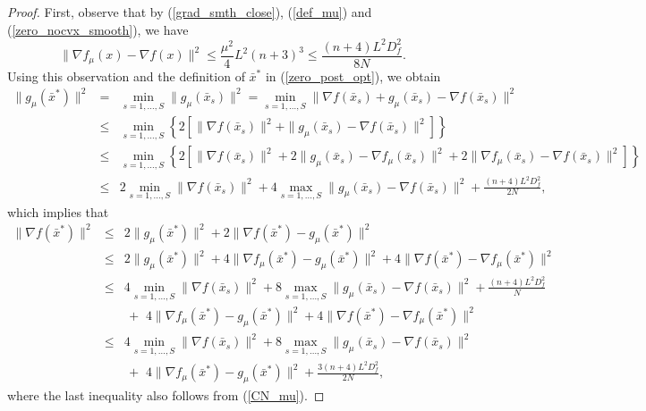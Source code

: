 \documentclass[final]{siamltex}
\newcommand{\beq}{\begin{equation}}
\newcommand{\eeq}{\end{equation}}
\newcommand{\beqa}{\begin{eqnarray}}
\newcommand{\eeqa}{\end{eqnarray}}
\newcommand{\beqas}{\begin{eqnarray*}}
\newcommand{\eeqas}{\end{eqnarray*}}
\newcommand{\nn}{\nonumber}
\def\eqnok#1{(\ref{#1})}
\def\cB{{\cal B}}
\begin{document}
\begin{proof}
First, observe that by \eqnok{grad_smth_close}, \eqnok{def_mu} and \eqnok{zero_nocvx_smooth}, we have
\beq \label{CN_mu}
\|\nabla f_{\mu}(x) - \nabla f(x)\|^2 \le \frac{\mu^2}{4} L^2(n+3)^3
\le \frac{(n+4)L^2 D_f^2}{8N}.
\eeq
Using this observation and the definition of $\bar x^*$ in \eqnok{zero_post_opt}, we obtain
\beqas
\|g_{\mu}(\bar x^*)\|^2 &=& \min_{s=1,\ldots,S} \|g_{\mu}(\bar x_s)\|^2
= \min_{s=1,\ldots,S} \|\nabla f(\bar x_s) + g_{\mu}(\bar x_s) - \nabla f(\bar x_s)\|^2  \\
&\le& \min_{s=1, \ldots,S} \left\{2 \left[\|\nabla f(\bar x_s)\|^2 +
\|g_{\mu}(\bar x_s) - \nabla f(\bar x_s) \|^2 \right]\right\} \\
&\le& \min_{s=1, \ldots,S} \left\{2 \left[\|\nabla f(\bar x_s)\|^2 +
2\|g_{\mu}(\bar x_s) - \nabla f_{\mu}(\bar x_s) \|^2+2\|\nabla f_{\mu}(\bar x_s) - \nabla f(\bar x_s) \|^2 \right]\right\}\\
&\le& 2 \min_{s=1, \ldots,S} \|\nabla f(\bar x_s)\|^2
+ 4 \max_{s=1,\ldots,S} \|g_{\mu}(\bar x_s) - \nabla f(\bar x_s) \|^2
+ \frac{(n+4)L^2 D_f^2}{2N},
\eeqas
which implies that
\beqa
\|\nabla f(\bar x^*)\|^2
&\le& 2\|g_{\mu}(\bar x^*)\|^2 + 2 \|\nabla f(\bar x^*) - g_{\mu}(\bar x^*)\|^2 \nn\\
&\le& 2 \|g_{\mu}(\bar x^*)\|^2 + 4 \|\nabla f_{\mu}(\bar x^*) - g_{\mu}(\bar x^*)\|^2 +4
\|\nabla f(\bar x^*) - \nabla f_{\mu}(\bar x^*)\|^2 \nn \\
&\le& 4 \min_{s=1, \ldots,S} \|\nabla f(\bar x_s)\|^2
+ 8 \max_{s=1,\ldots,S} \|g_{\mu}(\bar x_s) - \nabla f(\bar x_s) \|^2
+ \frac{(n+4)L^2 D_f^2}{N} \nn\\
&& \, +  \,\, 4 \|\nabla f_{\mu}(\bar x^*) - g_{\mu}(\bar x^*)\|^2 + 4
\|\nabla f(\bar x^*) - \nabla f_{\mu}(\bar x^*)\|^2\nn \\
&\le& 4 \min_{s=1, \ldots,S} \|\nabla f(\bar x_s)\|^2
+ 8 \max_{s=1,\ldots,S} \|g_{\mu}(\bar x_s) - \nabla f(\bar x_s) \|^2 \nn\\
&& \, + \,\, 4 \|\nabla f_{\mu}(\bar x^*) - g_{\mu}(\bar x^*)\|^2 + \frac{3(n+4)L^2 D_f^2}{2N},
\label{zero_rel_post}
\eeqa
where the last inequality also follows from \eqnok{CN_mu}.

\end{proof}
\end{document}
